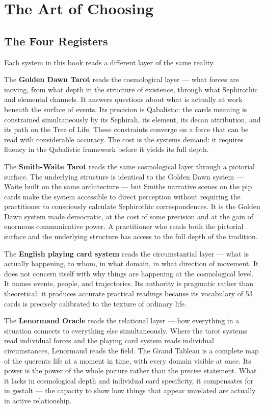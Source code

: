 \section{The Art of Choosing}\label{final-chapter-the-four-instruments-in-practice}

\subsection{The Four Registers}\label{the-four-registers}

Each system in this book reads a different layer of the same reality.

The \textbf{Golden Dawn Tarot} reads the cosmological layer --- what forces are moving, from what depth in the structure of existence, through what Sephirothic and elemental channels. It answers questions about what is actually at work beneath the surface of events. Its precision is Qabalistic: the card\textquotesingle s meaning is constrained simultaneously by its Sephirah, its element, its decan attribution, and its path on the Tree of Life. These constraints converge on a force that can be read with considerable accuracy. The cost is the system\textquotesingle s demand: it requires fluency in the Qabalistic framework before it yields its full depth.

The \textbf{Smith-Waite Tarot} reads the same cosmological layer through a pictorial surface. The underlying structure is identical to the Golden Dawn system --- Waite built on the same architecture --- but Smith\textquotesingle s narrative scenes on the pip cards make the system accessible to direct perception without requiring the practitioner to consciously calculate Sephirothic correspondences. It is the Golden Dawn system made democratic, at the cost of some precision and at the gain of enormous communicative power. A practitioner who reads both the pictorial surface and the underlying structure has access to the full depth of the tradition.

The \textbf{English playing card system} reads the circumstantial layer --- what is actually happening, to whom, in what domain, in what direction of movement. It does not concern itself with why things are happening at the cosmological level. It names events, people, and trajectories. Its authority is pragmatic rather than theoretical: it produces accurate practical readings because its vocabulary of 53 cards is precisely calibrated to the texture of ordinary life.

The \textbf{Lenormand Oracle} reads the relational layer --- how everything in a situation connects to everything else simultaneously. Where the tarot systems read individual forces and the playing card system reads individual circumstances, Lenormand reads the field. The Grand Tableau is a complete map of the querent\textquotesingle s life at a moment in time, with every domain visible at once. Its power is the power of the whole picture rather than the precise statement. What it lacks in cosmological depth and individual card specificity, it compensates for in gestalt --- the capacity to show how things that appear unrelated are actually in active relationship.

